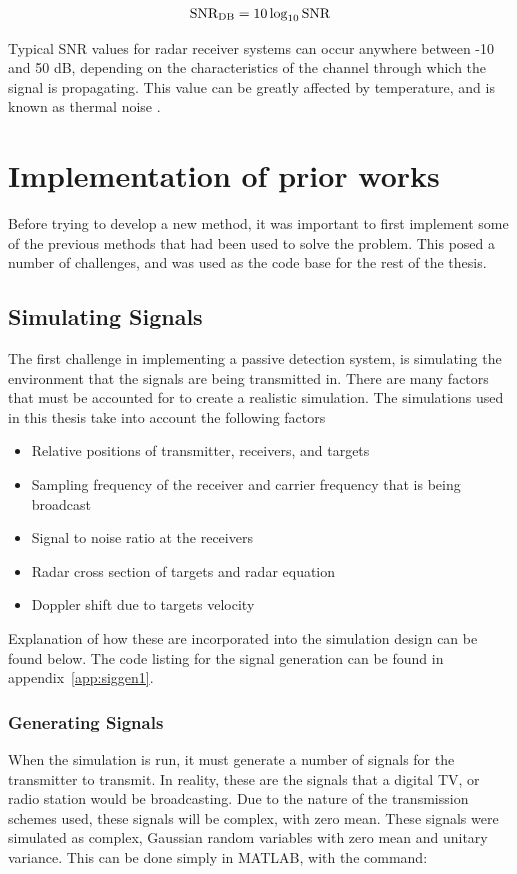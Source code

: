 \documentclass[12pt,openany,a4paper]{book}
\begin{document}
\begin{equation}
\textnormal{SNR}_{\textnormal{DB}} = 10 \log_{10}\textnormal{SNR}
\end{equation}

\bigskip

Typical SNR values for radar receiver systems can occur anywhere between -10 and 50 dB, depending on the characteristics of the channel through which the signal is propagating\cite{SNR}. This value can be greatly affected by temperature, and is known as thermal noise \cite{thermal}.

\cleardoublepage

\chapter{Implementation of prior works}

Before trying to develop a new method, it was important to first implement some of the previous methods that had been used to solve the problem. This posed a number of challenges, and was used as the code base for the rest of the thesis.

\section{Simulating Signals}
The first challenge in implementing a passive detection system, is simulating the environment that the signals are being transmitted in. There are many factors that must be accounted for to create a realistic simulation.
The simulations used in this thesis take into account the following factors

\begin{itemize}
	\item{Relative positions of transmitter, receivers, and targets}
	\item{Sampling frequency of the receiver and carrier frequency that is being broadcast}
	\item{Signal to noise ratio at the receivers}
	\item{Radar cross section of targets and radar equation}
	\item{Doppler shift due to targets velocity}
\end{itemize}

Explanation of how these are incorporated into the simulation design can be found below. The code listing for the signal generation can be found in appendix~\ref{app:siggen1}.

\subsection{Generating Signals}
When the simulation is run, it must generate a number of signals for the transmitter to transmit. In reality, these are the signals that a digital TV, or radio station would be broadcasting. Due to the nature of the transmission schemes used, these signals will be complex, with zero mean. These signals were simulated as complex, Gaussian random variables with zero mean and unitary variance. This can be done simply in MATLAB, with the command:
\end{document}
